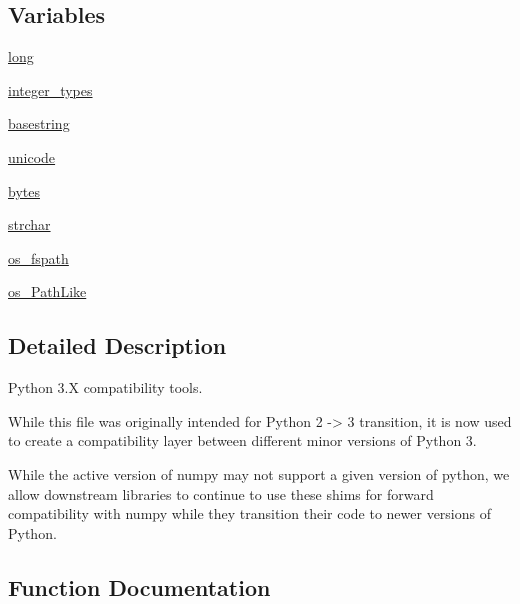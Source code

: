 \subsection*{Variables}
\begin{DoxyCompactItemize}
\item 
\hyperlink{namespacenumpy_1_1compat_1_1py3k_a321a70420ff8928fa2014dca95bceba7}{long}
\item 
\hyperlink{namespacenumpy_1_1compat_1_1py3k_afa0ed56323042bb1d0601895d0412df8}{integer\+\_\+types}
\item 
\hyperlink{namespacenumpy_1_1compat_1_1py3k_a4e72388eeef3bac0576cfb8b9c2dda21}{basestring}
\item 
\hyperlink{namespacenumpy_1_1compat_1_1py3k_a486d8b104ab251e8ac1f1374bb54c0f4}{unicode}
\item 
\hyperlink{namespacenumpy_1_1compat_1_1py3k_a8ef009ba771a8917110b56ce25849b54}{bytes}
\item 
\hyperlink{namespacenumpy_1_1compat_1_1py3k_aade8218188f107e1916bc4432ddb3309}{strchar}
\item 
\hyperlink{namespacenumpy_1_1compat_1_1py3k_a82f4f7a6f3ec8f99933a5d7d12ed7fbb}{os\+\_\+fspath}
\item 
\hyperlink{namespacenumpy_1_1compat_1_1py3k_a814ccde6042bdd4010204fb318527ed2}{os\+\_\+\+Path\+Like}
\end{DoxyCompactItemize}


\subsection{Detailed Description}
\begin{DoxyVerb}Python 3.X compatibility tools.

While this file was originally intended for Python 2 -> 3 transition,
it is now used to create a compatibility layer between different
minor versions of Python 3.

While the active version of numpy may not support a given version of python, we
allow downstream libraries to continue to use these shims for forward
compatibility with numpy while they transition their code to newer versions of
Python.
\end{DoxyVerb}
 

\subsection{Function Documentation}
\mbox{\label{namespacenumpy_1_1compat_1_1py3k_a0e4c1877cc0703fd83532b9457b70675}} 
